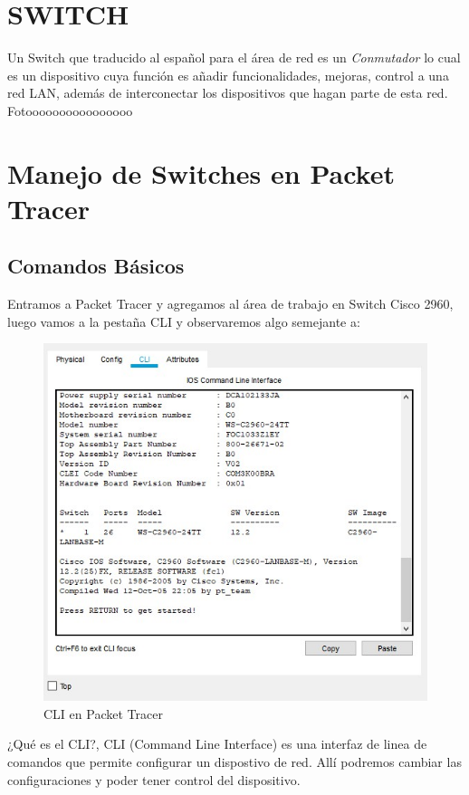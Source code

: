 \documentclass[journal]{IEEEtran}
\begin{document}
\section{SWITCH}
Un Switch que traducido al español para el área de red es un \textit{Conmutador} lo cual es un dispositivo cuya función es añadir funcionalidades, mejoras, control a una red LAN, además de interconectar los dispositivos que hagan parte de esta red.
Fotoooooooooooooooo

\section{Manejo de Switches en Packet Tracer}

\subsection{Comandos Básicos}
Entramos a Packet Tracer y agregamos al área de trabajo en Switch Cisco 2960, luego vamos a la pestaña CLI y observaremos algo semejante a:

\begin{figure}[ht]
	\centering
	\includegraphics[scale=0.5]{cli.jpg}
	\caption{CLI en Packet Tracer}
\end{figure}

¿Qué es el CLI?, CLI (Command Line Interface) es una interfaz de linea de comandos que permite configurar un dispostivo de red. Allí podremos cambiar las configuraciones y poder tener control del dispositivo.
\end{document}
